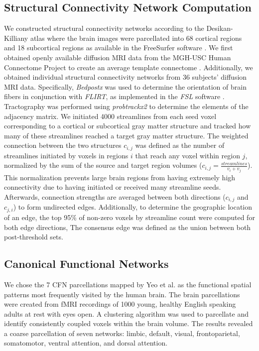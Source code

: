 \documentclass{article}
\begin{document}
\subsection{Structural Connectivity Network Computation} We constructed structural connectivity networks according to the Desikan-Killiany atlas where the brain images were parcellated into 68 cortical regions and 18 subcortical regions as available in the FreeSurfer software \cite{Fischl2002, Desikan2006}. We first obtained openly available diffusion MRI data from the MGH-USC Human Connectome Project to create an average template connectome \cite{McNab2013}. Additionally, we obtained individual structural connectivity networks from 36 subjects' diffusion MRI data. Specifically, \textit{Bedpostx} was used to determine the orientation of brain fibers in conjunction with \textit{FLIRT}, as implemented in the \textit{FSL} software \cite{Jenkinson2012}. Tractography was performed using \textit{probtrackx2} to determine the elements of the adjacency matrix. We initiated 4000 streamlines from each seed voxel corresponding to a cortical or subcortical gray matter structure and tracked how many of these streamlines reached a target gray matter structure.
The weighted connection between the two structures $c_{i,j}$ was defined as the number of streamlines initiated by voxels in regions $i$ that reach any voxel within region $j$, normalized by the sum of the source and target region volumes ($c_{i,j} = \frac{streamlines}{v_i + v_j}$). This normalization prevents large brain regions from having extremely high connectivity due to having initiated or received many streamline seeds. Afterwards, connection strengths are averaged between both directions ($c_{i,j}$ and $c_{j,i}$) to form undirected edges. Additionally, to determine the geographic location of an edge, the top 95\% of non-zero voxels by streamline count were computed for both edge directions, The consensus edge was defined as the union between both post-threshold sets.

\subsection{Canonical Functional Networks}
We chose the 7 CFN parcellations mapped by Yeo et al. \cite{Yeo2011} as the functional spatial patterns most frequently visited by the human brain. The brain parcellations were created from fMRI recordings of 1000 young, healthy English speaking adults at rest with eyes open. A clustering algorithm was used to parcellate and identify consistently coupled voxels within the brain volume. The results revealed a coarse parcellation of seven networks: limbic, default, visual, frontoparietal, somatomotor, ventral attention, and dorsal attention.
\end{document}
